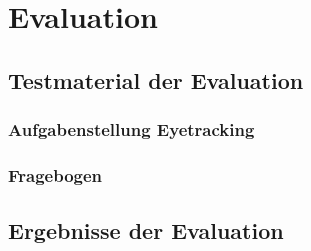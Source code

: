\documentclass[Bachelorarbeit.tex]{subfiles}
\begin{document}
\chapter{Evaluation}
\label{anhangEvaluation}

\section{Testmaterial der Evaluation}
\label{anhangTestmaterial}

\newpage
\subsection{Aufgabenstellung Eyetracking}
\label{anhangEyetracking}



\newpage
\subsection{Fragebogen}
\label{anhangFragebogen}



\section{Ergebnisse der Evaluation}
\label{anhangErgebnisse}
\end{document}
